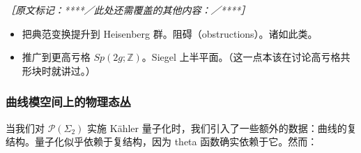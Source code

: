 {\small\itshape ［原文标记：****／此处还需覆盖的其他内容：／****］
\begin{itemize}[leftmargin=2em,itemsep=1pt,topsep=2pt]
  \item 把典范变换提升到 Heisenberg 群。阻碍（obstructions）。诸如此类。
  \item 推广到更高亏格 $Sp(2g;\mathbb{Z})$。Siegel 上半平面。（这一点本该在讨论高亏格共形块时就讲过。）
\end{itemize}}

\subsubsection{曲线模空间上的物理态丛} %

当我们对 $\mathcal{P}(\Sigma_2)$ 实施 Kähler 量子化时，我们引入了一些额外的数据：曲线的复结构。量子化似乎依赖于复结构，因为 theta 函数确实依赖于它。然而：

